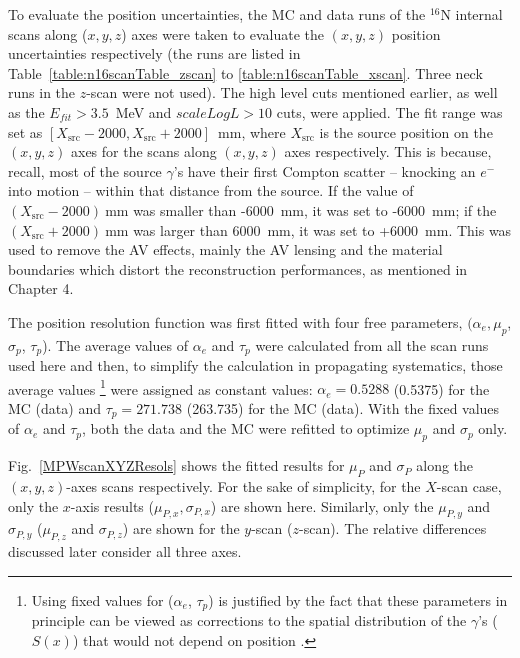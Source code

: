 To evaluate the position uncertainties, the MC and data runs of the $^{16}$N internal scans along ($x, y, z$) axes were taken to evaluate the $(x, y, z)$ position uncertainties respectively (the runs are listed in Table~\ref{table:n16scanTable_zscan} to \ref{table:n16scanTable_xscan}. Three neck runs in the $z$-scan were not used). The high level cuts mentioned earlier, as well as the $E_{fit}>3.5$~MeV and $scaleLogL>10$ cuts, were applied. The fit range was set as $[X_\mathrm{src}-2000, X_\mathrm{src}+2000]$~mm, where $X_\mathrm{src}$ is the source position on the $(x,y,z)$ axes for the scans along $(x,y,z)$ axes respectively. This is because, recall, most of the source $\gamma$'s have their first Compton scatter -- knocking an $e^{-}$ into motion -- within that distance from the source. If the value of $(X_\mathrm{src}-2000)~$mm was smaller than -6000~mm, it was set to -6000~mm; if the $(X_\mathrm{src}+2000)~$mm was larger than 6000~mm, it was set to +6000~mm. This was used to remove the AV effects, mainly the AV lensing and the material boundaries which distort the reconstruction performances, as mentioned in Chapter 4.

The position resolution function was first fitted with four free parameters, $(\alpha_e,\mu_p$, $\sigma_p$, $\tau_p$). The average values of $\alpha_e$ and $\tau_p$ were calculated from all the scan runs used here and then, to simplify the calculation in propagating systematics, those average values \footnote{Using fixed values for ($\alpha_e$, $\tau_p$) is justified by the fact that these parameters in principle can be viewed as corrections to the spatial distribution of the $\gamma$'s ($S(x)$) that would not depend on position \cite{waterunidoc}.} were assigned as constant values: $\alpha_e=0.5288$ (0.5375) for the MC (data) and $\tau_p=271.738$ (263.735) for the MC (data). With the fixed values of $\alpha_e$ and $\tau_p$, both the data and the MC were refitted to optimize $\mu_p$ and $\sigma_p$ only. 

Fig.~\ref{MPWscanXYZResols} shows the fitted results for $\mu_P$ and $\sigma_P$ along the $(x, y, z)$-axes scans respectively. For the sake of simplicity, for the $X$-scan case, only the $x$-axis results ($\mu_{P,x},\sigma_{P,x}$) are shown here. Similarly, only the $\mu_{P,y}$ and $\sigma_{P,y}$ ($\mu_{P,z}$ and $\sigma_{P,z}$) are shown for the $y$-scan ($z$-scan). The relative differences discussed later consider all three axes.

